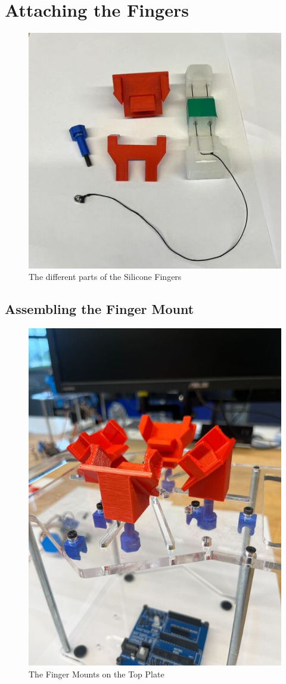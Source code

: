 \documentclass{article}
\begin{document}
\section{Attaching the Fingers}
\begin{figure}[H]
    \centering
    \includegraphics[width=0.5\linewidth]{PCBImages/AttachingFingers/attaching_fingers_1.png}
    \caption{The different parts of the Silicone Fingers}
    \label{fig:silicone_fingers_parts}
\end{figure}

\subsection{Assembling the Finger Mount}
\begin{figure}[H]
    \centering
    \includegraphics[width=0.5\linewidth]{PCBImages/AttachingFingers/attaching_fingers_2.jpg}
    \caption{The Finger Mounts on the Top Plate}
    \label{fig:finger_mount_top_plate}
\end{figure}
\end{document}
